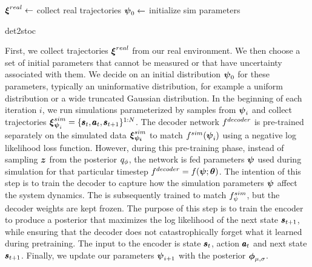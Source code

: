 \vspace{\baselineskip}%
\begin{algorithm}[H]
  \DontPrintSemicolon
  $\boldsymbol{\xi}^{real} \leftarrow$ collect real trajectories \; \label{det2stoc:step1}
  $\boldsymbol{\psi}_0 \leftarrow$ initialize sim parameters \;
  \caption{det2stoc}
  \label{alg:det2stoc}
\end{algorithm}
\vspace{\baselineskip}%
First, we collect trajectories $\boldsymbol{\xi}^{real}$ from our real environment.
We then choose a set of initial parameters that cannot be measured or that have uncertainty associated with them. We decide on an initial distribution $\boldsymbol{\psi}_0$ for these parameters, typically an uninformative distribution, for example a uniform distribution or a wide truncated Gaussian distribution.
In the beginning of each iteration $i$, we run simulations parameterized by samples from $\boldsymbol{\psi}_i$ and collect trajectories $\boldsymbol{\xi}^{sim}_{\boldsymbol{\psi}_i}=\{\pmb{s}_t, \pmb{a}_t, \pmb{s}_{t+1}\}^{1:N}$. The decoder network $f^{decoder}{}$ is pre-trained separately on the simulated data $\boldsymbol{\xi}^{sim}_{\boldsymbol{\psi_i}}{}$ to match $f^{sim}(\boldsymbol{\psi}_i)$ using a negative log likelihood loss function. However, during this pre-training phase, instead of sampling $\boldsymbol{z}$ from the posterior $q_{\phi}$, the network is fed parameters $\boldsymbol{\psi}$ used during simulation for that particular timestep $f^{decoder} = f(\boldsymbol{\psi}; \boldsymbol{\theta})$. The intention of this step is to train the decoder to capture how the simulation parameters $\boldsymbol{\psi}$ affect the system dynamics.%
The \cvae{} is subsequently trained to match $f^{sim}_{\psi}{}$, but the decoder weights are kept frozen. The purpose of this step is to train the encoder to produce a posterior that maximizes the log likelihood of the next state $\pmb{s}_{t+1}$, while ensuring that the decoder does not catastrophically forget \parencite{French2006CatastrophicFI} what it learned during pretraining. The input to the encoder is state $\pmb{s}_t$, action $\pmb{a}_t$ and next state $\pmb{s}_{t+1}$. %
Finally, we update our parameters $\boldsymbol{\psi}_{i+1}$ with the posterior $\boldsymbol{\phi}_{\mu, \sigma}$.

